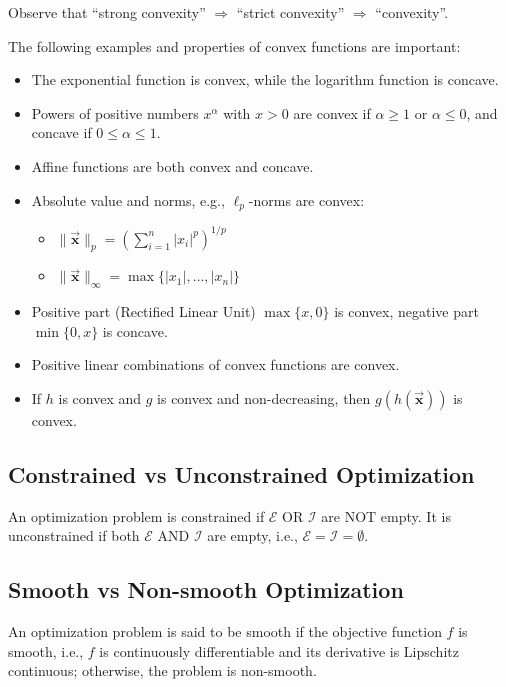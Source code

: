 \documentclass[9pt, headings=standardclasses, parskip=half]{scrartcl}
\renewcommand{\emph}[1]{\textcolor{mypurple}{#1}}
\newcommand{\vect}[1]{\vec{\boldsymbol{#1}}}
\begin{document}
Observe that ``strong convexity'' $\Longrightarrow$ ``strict convexity'' $\Longrightarrow$ ``convexity''.

\begin{example}\label{ex:convex_functions}
The following examples and properties of convex functions are important:
\begin{itemize}
\item The exponential function is convex, while the logarithm function is concave. 
\item Powers of positive numbers $x^{\alpha}$ with $x>0$ are convex if $\alpha \geq 1$ or $\alpha \leq 0$, and concave if $0 \leq \alpha \leq 1$.
\item Affine functions are both convex and concave.
\item Absolute value and norms, e.g., $\ell_p$-norms are convex:
\begin{itemize}
  \item $\| \vect{x}\|_{p} = \left(\sum_{i=1}^{n}|x_{i}|^{p}\right)^{1/p}$
  \item $\| \vect{x}\|_{\infty}=\max\{|x_{1}|,\dots,|x_{n}|\}$
\end{itemize}
\item Positive part (Rectified Linear Unit) $\max\{x, 0\}$ is convex, negative part $\min\{0,x\}$ is concave.
\item Positive linear combinations of convex functions are convex.
\item If \(h\) is convex and \(g\) is convex and non-decreasing, then \(g\left(h(\vect{x})\right)\) is convex.\qedhere
\end{itemize}
\end{example}

\subsection{Constrained vs Unconstrained Optimization}

An optimization problem is \emph{constrained} if \(\mathcal{E}\) OR \(\mathcal{I}\) are NOT empty. It is \emph{unconstrained} if both \(\mathcal{E}\) AND \(\mathcal{I}\) are empty, i.e., \(\mathcal{E}=\mathcal{I}=\emptyset\).

\subsection{Smooth vs Non-smooth Optimization}
\label{subsec:smooth_non_smooth}
An optimization problem is said to be \emph{smooth} if the objective function \(f\) is smooth, i.e., $f$ is continuously differentiable and its derivative is Lipschitz continuous; otherwise, the problem is \emph{non-smooth}. 
\end{document}
